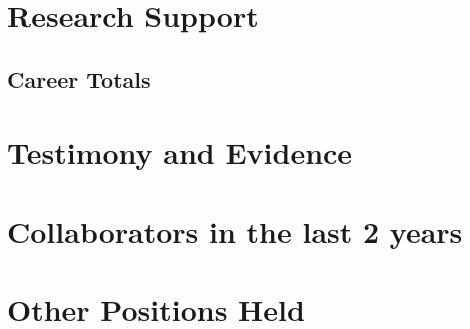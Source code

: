 \documentclass[letter,10pt]{article}
\begin{document}
\section{Research Support}
\subsection{Career Totals}



\section{Testimony and Evidence}


\section{Collaborators in the last 2 years}


\section{Other Positions Held}

\end{document}
